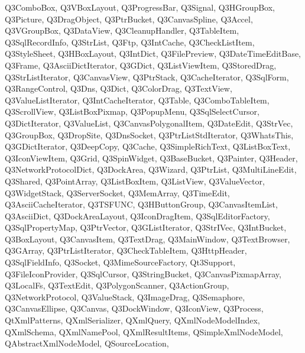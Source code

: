 {{    Q3ComboBox,%
    Q3VBoxLayout,%
    Q3ProgressBar,%
    Q3Signal,%
    Q3HGroupBox,%
    Q3Picture,%
    Q3DragObject,%
    Q3PtrBucket,%
    Q3CanvasSpline,%
    Q3Accel,%
    Q3VGroupBox,%
    Q3DataView,%
    Q3CleanupHandler,%
    Q3TableItem,%
    Q3SqlRecordInfo,%
    Q3StrList,%
    Q3Ftp,%
    Q3IntCache,%
    Q3CheckListItem,%
    Q3StyleSheet,%
    Q3HBoxLayout,%
    Q3IntDict,%
    Q3FilePreview,%
    Q3DateTimeEditBase,%
    Q3Frame,%
    Q3AsciiDictIterator,%
    Q3GDict,%
    Q3ListViewItem,%
    Q3StoredDrag,%
    Q3StrListIterator,%
    Q3CanvasView,%
    Q3PtrStack,%
    Q3CacheIterator,%
    Q3SqlForm,%
    Q3RangeControl,%
    Q3Dns,%
    Q3Dict,%
    Q3ColorDrag,%
    Q3TextView,%
    Q3ValueListIterator,%
    Q3IntCacheIterator,%
    Q3Table,%
    Q3ComboTableItem,%
    Q3ScrollView,%
    Q3ListBoxPixmap,%
    Q3PopupMenu,%
    Q3SqlSelectCursor,%
    Q3DictIterator,%
    Q3ValueList,%
    Q3CanvasPolygonalItem,%
    Q3DateEdit,%
    Q3StrVec,%
    Q3GroupBox,%
    Q3DropSite,%
    Q3DnsSocket,%
    Q3PtrListStdIterator,%
    Q3WhatsThis,%
    Q3GDictIterator,%
    Q3DeepCopy,%
    Q3Cache,%
    Q3SimpleRichText,%
    Q3ListBoxText,%
    Q3IconViewItem,%
    Q3Grid,%
    Q3SpinWidget,%
    Q3BaseBucket,%
    Q3Painter,%
    Q3Header,%
    Q3NetworkProtocolDict,%
    Q3DockArea,%
    Q3Wizard,%
    Q3PtrList,%
    Q3MultiLineEdit,%
    Q3Shared,%
    Q3PointArray,%
    Q3ListBoxItem,%
    Q3ListView,%
    Q3ValueVector,%
    Q3WidgetStack,%
    Q3ServerSocket,%
    Q3MemArray,%
    Q3TimeEdit,%
    Q3AsciiCacheIterator,%
    Q3TSFUNC,%
    Q3HButtonGroup,%
    Q3CanvasItemList,%
    Q3AsciiDict,%
    Q3DockAreaLayout,%
    Q3IconDragItem,%
    Q3SqlEditorFactory,%
    Q3SqlPropertyMap,%
    Q3PtrVector,%
    Q3GListIterator,%
    Q3StrIVec,%
    Q3IntBucket,%
    Q3BoxLayout,%
    Q3CanvasItem,%
    Q3TextDrag,%
    Q3MainWindow,%
    Q3TextBrowser,%
    Q3GArray,%
    Q3PtrListIterator,%
    Q3CheckTableItem,%
    Q3HttpHeader,%
    Q3SqlFieldInfo,%
    Q3Socket,%
    Q3MimeSourceFactory,%
    Qt3Support,%
    Q3FileIconProvider,%
    Q3SqlCursor,%
    Q3StringBucket,%
    Q3CanvasPixmapArray,%
    Q3LocalFs,%
    Q3TextEdit,%
    Q3PolygonScanner,%
    Q3ActionGroup,%
    Q3NetworkProtocol,%
    Q3ValueStack,%
    Q3ImageDrag,%
    Q3Semaphore,%
    Q3CanvasEllipse,%
    Q3Canvas,%
    Q3DockWindow,%
    Q3IconView,%
    Q3Process,%
    QtXmlPatterns,%
    QXmlSerializer,%
    QXmlQuery,%
    QXmlNodeModelIndex,%
    QXmlSchema,%
    QXmlNamePool,%
    QXmlResultItems,%
    QSimpleXmlNodeModel,%
    QAbstractXmlNodeModel,%
    QSourceLocation,%
}}
